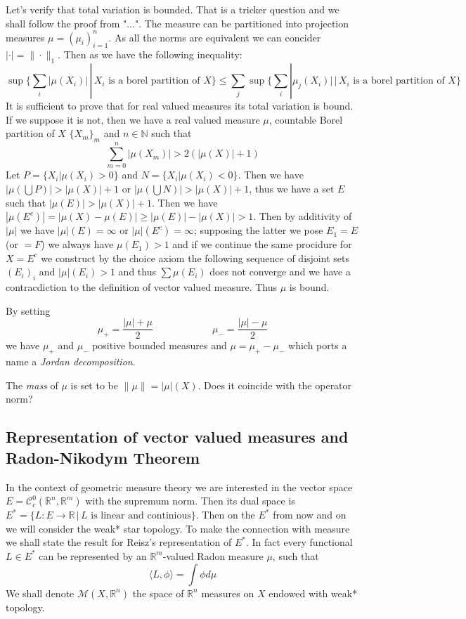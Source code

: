 \documentclass{article}
\begin{document}
\vspace{1ex}
Let's verify that total variation is bounded.
That is a tricker question and we
shall follow the proof from "...". The measure can be partitioned into projection measures
$\mu=(\mu_i)_{i=1}^n$. As all the norms are equivalent we can concider $|\cdot|
= \|\cdot\|_1$. Then as we have the following inequality:
\[\sup\{\sum_i|\mu(X_i)|\,|\,X_i\text{ is a borel partition of }X\} \leq \sum_j\sup\{\sum_i|\mu_j(X_i)|\,|\,X_i\text{ is a borel partition of }X\}\]
It is sufficient to prove that for real valued measures its total variation is bound.
If we suppose it is not, then we have a real valued measure $\mu$,
countable Borel partition of $X$ $\{X_m\}_m$ and $n\in\mathbb{N}$ such that
\[\sum_{m=0}^n|\mu(X_m)|>2(|\mu(X)|+1)\]
Let $P=\{X_i|\mu(X_i)>0\}$ and $N=\{X_i|\mu(X_i)<0\}$. Then
we have $|\mu(\bigcup P)|>|\mu(X)|+1$ or $|\mu(\bigcup N)|>|\mu(X)|+1$, thus we
have a set $E$ such that $|\mu(E)|>|\mu(X)|+1$. Then we have $|\mu(E^c)|=|\mu(X)
-\mu(E)|\geq |\mu(E)|-|\mu(X)|>1$. Then by additivity of $|\mu|$ we have
$|\mu|(E)=\infty$ or $|\mu|(E^c)=\infty$; supposing the latter we pose $E_1=E$
(or $=F$) we always have $\mu(E_1)>1$ and if we continue the same procidure for
$X=E^c$ we construct by the choice axiom the following sequence of disjoint sets
$(E_i)_i$ and $|\mu|(E_i)>1$ and thus $\sum\mu(E_i)$ does not converge and we
have a contracdiction to the definition of vector valued measure. Thus $\mu$
is bound.

\vspace{1ex}
By setting
\[\mu_+=\frac{|\mu|+\mu}{2}\quad\quad\quad\quad\quad\quad\mu_-=\frac{|\mu|-\mu}{2}\]
we have $\mu_+$ and $\mu_-$ positive bounded measures and $\mu=\mu_+-\mu_-$
which ports a name a \emph{Jordan decomposition}.


\vspace{1ex}
The \emph{mass} of $\mu$ is set to be $\|\mu\|=|\mu|(X)$. Does it coincide with
the operator norm?

\subsection{Representation of vector valued measures and Radon-Nikodym Theorem}

\vspace{1ex}
In the context of geometric measure theory we are interested in the vector
space $E=\mathcal{C}^0_c(\mathbb{R}^n, \mathbb{R}^m)$ with the supremum norm.
Then its dual space is $E^*=\{L:E\rightarrow\mathbb{R}\,|\,L\text{ is linear
and continious}\}$. Then on the $E^*$ from now and on we will consider the weak*
star topology. To make the connection with measure we shall state the result for
Reisz's representation of $E^*$. In fact every functional $L\in E^*$ can be
represented by an $\mathbb{R}^m$-valued Radon measure $\mu$, such that
\[\langle L,\phi\rangle=\int\phi d\mu\]
We shall denote $\mathcal{M}(X,\mathbb{R}^n)$ the space of $\mathbb{R}^n$
measures on $X$ endowed with weak* topology.
\end{document}
